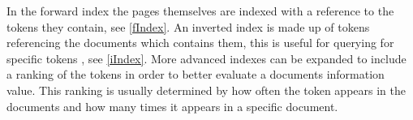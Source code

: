 In the forward index the pages themselves are indexed with a reference to the
tokens they contain, see \autoref{fIndex}. An inverted index is made up of
tokens referencing the documents which contains them, this is useful for
querying for specific tokens \citep{Index3}, see \autoref{iIndex}. More advanced
indexes can be expanded to include a ranking of the tokens in order to better
evaluate a documents information value. This ranking is usually determined by
how often the token appears in the documents and how many times it appears in a
specific document.
